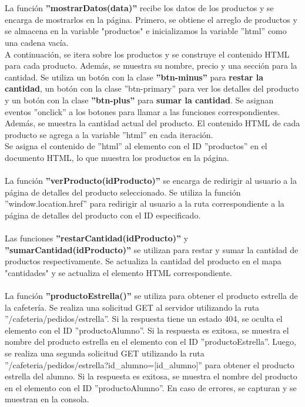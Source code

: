 \documentclass[12pt]{report}
\begin{document}
\\\\
La función \textbf{''mostrarDatos(data)''} recibe los datos de los productos y se encarga de mostrarlos en la página. Primero, se obtiene el arreglo de productos y se almacena en la variable "productos" e inicializamos la variable ''html'' como una cadena vacía.
\\A continuación, se itera sobre los productos y se construye el contenido HTML para cada producto. Además, se muestra su nombre, precio y una sección para la cantidad. Se utiliza un botón con la clase \textbf{''btn-minus''} para \textbf{restar la cantidad}, un botón con la clase ''btn-primary'' para ver los detalles del producto y un botón con la clase \textbf{''btn-plus''} para \textbf{sumar la cantidad}. Se asignan eventos ''onclick'' a los botones para llamar a las funciones correspondientes. Además, se muestra la cantidad actual del producto. El contenido HTML de cada producto se agrega a la variable ''html'' en cada iteración.
\\
Se asigna el contenido de ''html'' al elemento con el ID ''productos'' en el documento HTML, lo que muestra los productos en la página.
\\\\
La función \textbf{''verProducto(idProducto)''} se encarga de redirigir al usuario a la página de detalles del producto seleccionado. Se utiliza la función ''window.location.href'' para redirigir al usuario a la ruta correspondiente a la página de detalles del producto con el ID especificado.
\\\\
Las funciones \textbf{''restarCantidad(idProducto)''} y \textbf{''sumarCantidad(idProducto)''} se utilizan para restar y sumar la cantidad de productos respectivamente. Se actualiza la cantidad del producto en el mapa "cantidades" y se actualiza el elemento HTML correspondiente.
\\\\
La función \textbf{''productoEstrella()''} se utiliza para obtener el producto estrella de la cafetería. Se realiza una solicitud GET al servidor utilizando la ruta ''/cafeteria/pedidos/estrella''. Si la respuesta tiene un estado 404, se oculta el elemento con el ID ''productoAlumno''. Si la respuesta es exitosa, se muestra el nombre del producto estrella en el elemento con el ID ''productoEstrella''. Luego, se realiza una segunda solicitud GET utilizando la ruta ''/cafeteria/pedidos/estrella?id\_alumno=[id\_alumno]'' para obtener el producto estrella del alumno. Si la respuesta es exitosa, se muestra el nombre del producto en el elemento con el ID ''productoAlumno''. En caso de errores, se capturan y se muestran en la consola.
\end{document}
